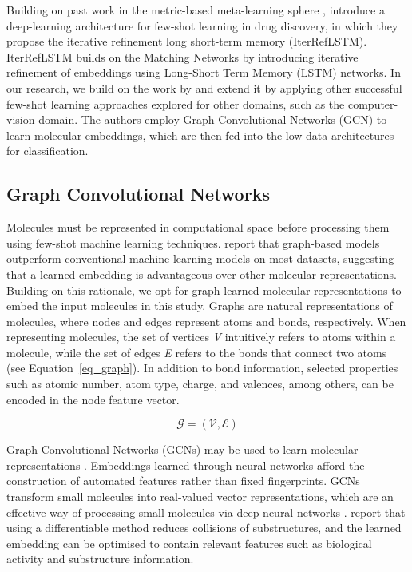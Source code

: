 Building on past work in the metric-based meta-learning sphere \cite{vinyals2016matching}, \citet{altae2017low} introduce a deep-learning architecture for few-shot learning in drug discovery, in which they propose the iterative refinement long short-term memory (IterRefLSTM). IterRefLSTM builds on the Matching Networks \cite{vinyals2016matching} by introducing iterative refinement of embeddings using Long-Short Term Memory (LSTM) networks. In our research, we build on the work by \citet{altae2017low} and extend it by applying other successful few-shot learning approaches explored for other domains, such as the computer-vision domain. The authors employ Graph Convolutional Networks (GCN) to learn molecular embeddings, which are then fed into the low-data architectures for classification.

\subsection{Graph Convolutional Networks}

Molecules must be represented in computational space before processing them using few-shot machine learning techniques. \citet{wu2018moleculenet} report that graph-based models outperform conventional machine learning models on most datasets, suggesting that a learned embedding is advantageous over other molecular representations. Building on this rationale, we opt for graph learned molecular representations to embed the input molecules in this study. Graphs are natural representations of molecules, where nodes and edges represent atoms and bonds, respectively. When representing molecules, the set of vertices \textit{V} intuitively refers to atoms within a molecule, while the set of edges \textit{E} refers to the bonds that connect two atoms (see Equation~\ref{eq_graph}). In addition to bond information, selected properties such as atomic number, atom type, charge, and valences, among others, can be encoded in the node feature vector.

\begin{equation}\label{eq_graph}
    \mathcal{G}=(\mathcal{V}, \mathcal{E})
\end{equation}

Graph Convolutional Networks (GCNs) may be used to learn molecular representations \cite{jiang2021could}. Embeddings learned through neural networks afford the construction of automated features rather than fixed fingerprints. GCNs transform small molecules into real-valued vector representations, which are an effective way of processing small molecules via deep neural networks \cite{gomez2018automatic}. \citet{duvenaud2015convolutional} report that using a differentiable method reduces collisions of substructures, and the learned embedding can be optimised to contain relevant features such as biological activity and substructure information.

